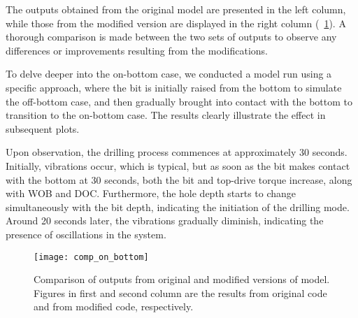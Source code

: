 The outputs obtained from the original model are presented in the left column, while those from the modified version are displayed in the right column (\figurename~\ref{Comaprison_on_bottom}). A thorough comparison is made between the two sets of outputs to observe any differences or improvements resulting from the modifications.

To delve deeper into the on-bottom case, we conducted a model run using a specific approach, where the bit is initially raised from the bottom to simulate the off-bottom case, and then gradually brought into contact with the bottom to transition to the on-bottom case. The results clearly illustrate the effect in subsequent plots.

Upon observation, the drilling process commences at approximately 30 seconds. Initially, vibrations occur, which is typical, but as soon as the bit makes contact with the bottom at 30 seconds, both the bit and top-drive torque increase, along with WOB and DOC. Furthermore, the hole depth starts to change simultaneously with the bit depth, indicating the initiation of the drilling mode. Around 20 seconds later, the vibrations gradually diminish, indicating the presence of oscillations in the system.

\begin{figure}
  \centering
  \texttt{[image: comp\_on\_bottom]}
  \caption[Output comparison or original and modified model]{Comparison of outputs from original and modified versions of model. Figures in first and second column are the results from original code and from modified code, respectively.}\label{Comaprison_on_bottom}
\end{figure} 